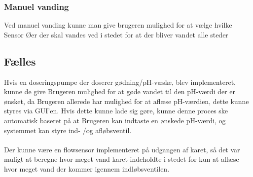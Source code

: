 \subsubsection{Manuel vanding}
Ved manuel vanding kunne man give brugeren mulighed for at vælge hvilke Sensor Øer der skal vandes ved i stedet for at der bliver vandet alle steder 

\subsection{Fælles}
Hvis en doseringspumpe der doserer gødning/pH-væske, blev implementeret, kunne de give Brugeren mulighed for at gøde vandet til den pH-værdi der er ønsket, da Brugeren allerede har mulighed for at aflæse pH-værdien, dette kunne styres via GUI'en. Hvis dette kunne lade sig gøre, kunne denne proces ske automatisk baseret på at Brugeren kan indtaste en ønskede pH-værdi, og systemmet kan styre ind- /og afløbsventil. 
\\\\
Der kunne være en flowsensor implementeret på udgangen af karet, så det var muligt at beregne hvor meget vand karet indeholdte i stedet for kun at aflæse hvor meget vand der kommer igennem indløbsventilen. 